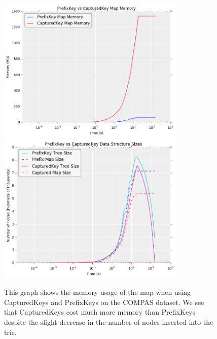 \begin{figure}
	\begin{center}
	\includegraphics[width=0.8\textwidth]{figs/prefix-captured_pmap_mem.png}
	\includegraphics[width=0.8\textwidth]{figs/prefix-captured_tree_size.png}
	\caption{This graph shows the memory usage of the map when using CapturedKeys and PrefixKeys on the COMPAS dataset. 
We see that CapturedKeys cost much more memory than PrefixKeys despite the slight decrease in the number of nodes inserted into the trie.}
\label{fig:prefix-captured}
	\end{center}
\end{figure}


